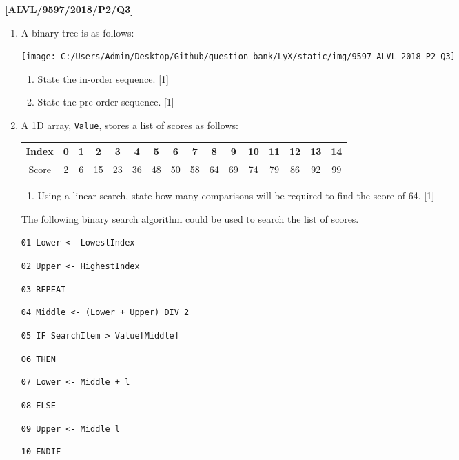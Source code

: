 \item \textbf{{[}ALVL/9597/2018/P2/Q3{]} }
\begin{enumerate}
\item A binary tree is as follows: 
\begin{center}
\texttt{[image: C:/Users/Admin/Desktop/Github/question\_bank/LyX/static/img/9597-ALVL-2018-P2-Q3]}
\par\end{center}
\begin{enumerate}
\item State the in-order sequence. \hfill{}{[}1{]}
\item State the pre-order sequence. \hfill{} {[}1{]}
\end{enumerate}
\item A 1D array, \texttt{Value}, stores a list of scores as follows:
\begin{center}
\begin{tabular}{|c|c|c|c|c|c|c|c|c|c|c|c|c|c|c|c|}
\hline 
Index & 0 & 1 & 2 & 3 & 4 & 5 & 6 & 7 & 8 & 9 & 10 & 11 & 12 & 13 & 14\tabularnewline
\hline 
Score & 2 & 6 & 15 & 23 & 36 & 48 & 50 & 58 & 64 & 69 & 74 & 79 & 86 & 92 & 99\tabularnewline
\hline 
\end{tabular}
\par\end{center}
\begin{enumerate}
\item Using a linear search, state how many comparisons will be required
to find the score of 64. \hfill{}{[}1{]}
\end{enumerate}
The following binary search algorithm could be used to search the
list of scores.

\noindent\begin{minipage}[t]{1\columnwidth}%
\texttt{01 Lower <- LowestIndex}

\texttt{02 Upper <- HighestIndex}

\texttt{03 REPEAT}

\texttt{04 \qquad{}Middle <- (Lower + Upper) DIV 2}

\texttt{05 \qquad{}IF SearchItem > Value{[}Middle{]}}

\texttt{O6 \qquad{}THEN}

\texttt{07 \qquad{}\qquad{}Lower <- Middle + l}

\texttt{08 \qquad{}ELSE}

\texttt{09 \qquad{}\qquad{}Upper <- Middle \textemdash{} l}

\texttt{10 \qquad{}ENDIF}


\end{minipage}
\end{enumerate}
